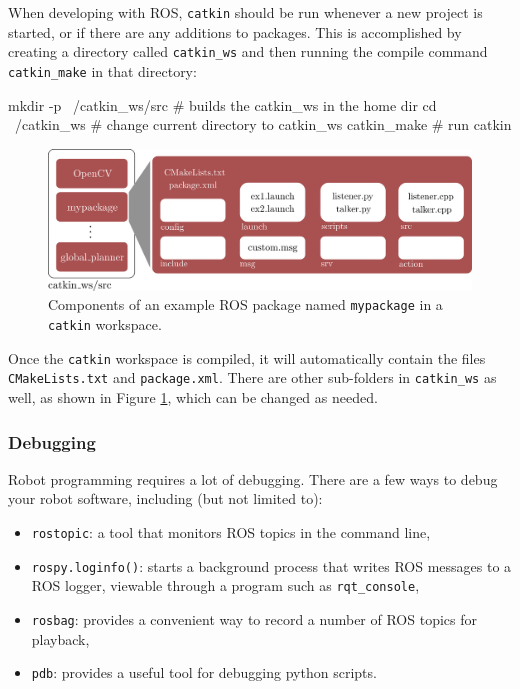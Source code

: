 When developing with ROS, \texttt{catkin} should be run whenever a new project is started, or if there are any additions to packages. This is accomplished by creating a directory called \texttt{catkin\_ws} and then running the compile command \texttt{catkin\_make} in that directory:
\begin{gencode}
mkdir -p ~/catkin_ws/src  # builds the catkin_ws in the home dir
cd ~/catkin_ws            # change current directory to catkin_ws
catkin_make               # run catkin
\end{gencode}

\begin{figure}[t] 
    \centering 
    \includegraphics[width=0.75\linewidth]{tex/figs/ch02_figs/catkin_ws.png}
    \caption{Components of an example ROS package named \texttt{mypackage} in a \texttt{catkin} workspace.}
    \label{catkin} 
\end{figure} 

Once the \texttt{catkin} workspace is compiled, it will automatically contain the files \texttt{CMakeLists.txt} and \texttt{package.xml}. There are other sub-folders in \texttt{catkin\_ws} as well, as shown in Figure \ref{catkin}, which can be changed as needed.

\subsubsection{Debugging}
Robot programming requires a lot of debugging. There are a few ways to debug your robot software, including (but not limited to): 
\begin{itemize}
    \item \verb|rostopic|: a tool that monitors ROS topics in the command line,
    \item \verb|rospy.loginfo()|: starts a background process that writes ROS messages to a ROS logger, viewable through a program such as \verb|rqt_console|,
    \item \verb|rosbag|: provides a convenient way to record a number of ROS topics for playback,
    \item \texttt{pdb}: provides a useful tool for debugging python scripts.
\end{itemize}

